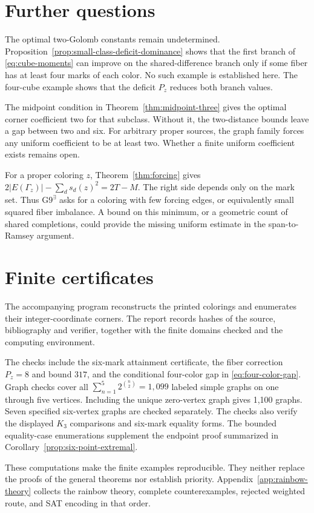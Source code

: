 \documentclass[11pt,a4paper]{article}
\newif\ifshowrevisions
\newenvironment{revision}{\par\begingroup\ifshowrevisions\color{red}\fi}{\par\endgroup}
\theoremstyle{definition}
\numberwithin{equation}{section}
\begin{document}
\section{Further questions}\label{sec:discussion}
The optimal two-Golomb constants remain undetermined. Proposition~\ref{prop:small-class-deficit-dominance} shows that the first branch of \eqref{eq:cube-moments} can improve on the shared-difference branch only if some fiber has at least four marks of each color. No such example is established here. The four-cube example shows that the deficit $P_z$ reduces both branch values.

The midpoint condition in Theorem~\ref{thm:midpoint-three} gives the optimal corner coefficient two for that subclass. Without it, the two-distance bounds leave a gap between two and six. For arbitrary proper sources, the graph family forces any uniform coefficient to be at least two. Whether a finite uniform coefficient exists remains open.

For a proper coloring $z$, Theorem~\ref{thm:forcing} gives
$2|E(\Gamma_z)|-\sum_ds_d(z)^2=2T-M$.
The right side depends only on the mark set. Thus $\mathrm{G9}^{\exists}$ asks for a coloring with few forcing edges, or equivalently small squared fiber imbalance. A bound on this minimum, or a geometric count of shared completions, could provide the missing uniform estimate in the span-to-Ramsey argument.
\label{body-end}

\appendix

\section{Finite certificates}\label{app:verification}
\begin{revision}
The accompanying program  reconstructs the printed colorings and enumerates their integer-coordinate corners. The report  records hashes of the source, bibliography and verifier, together with the finite domains checked and the computing environment.

The checks include the six-mark attainment certificate, the fiber correction $P_z=8$ and bound $317$, and the conditional four-color gap in \eqref{eq:four-color-gap}. Graph checks cover all $\sum_{n=1}^{5}2^{\binom n2}=1{,}099$ labeled simple graphs on one through five vertices. Including the unique zero-vertex graph gives 1,100 graphs. Seven specified six-vertex graphs are checked separately. The checks also verify the displayed $K_3$ comparisons and six-mark equality forms. The bounded equality-case enumerations supplement the endpoint proof summarized in Corollary~\ref{prop:six-point-extremal}.

These computations make the finite examples reproducible. They neither replace the proofs of the general theorems nor establish priority. Appendix~\ref{app:rainbow-theory} collects the rainbow theory, complete counterexamples, rejected weighted route, and SAT encoding in that order.
\end{revision}
\end{document}
